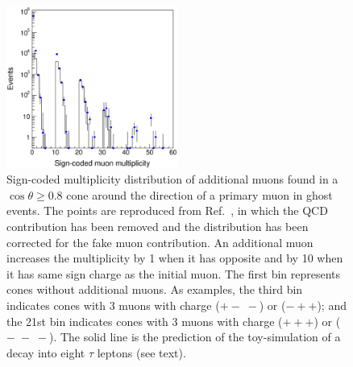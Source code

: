 \documentclass[twocolumn,10pt,prl,preprint,floatfix,nofootinbib,superscriptaddress,showpacs,amssymb]{revtex4}
\begin{document}
 \begin{figure}
 \begin{center}
 \vspace{-0.2in}
 \leavevmode
 \includegraphics*[width=0.5\textwidth]{fa0_14_tau.eps}
 \caption[]{Sign-coded multiplicity distribution of additional muons found
            in a $\cos \theta \geq 0.8$ cone around the direction of a
            primary muon in ghost events. The points are reproduced from
            Ref.~\cite{a0disc}, in which the QCD contribution has been
	    removed and the distribution has been corrected for the fake muon
            contribution. An additional muon increases the multiplicity by
            1 when it has opposite and by 10 when it has same sign charge as
            the initial muon. The first bin represents cones without additional muons.
         As examples, the third bin indicates cones
            with 3 muons with charge ($+-\;-$) or ($-++$); and the 21st bin
            indicates cones with 3 muons with charge ($+++$) or ($-\;-\;-$).
	    The solid line is the prediction of the toy-simulation of a decay
            into eight $\tau$ leptons (see text).}
 \label{fig:fig_14}
 \end{center}
 \end{figure}
\end{document}
